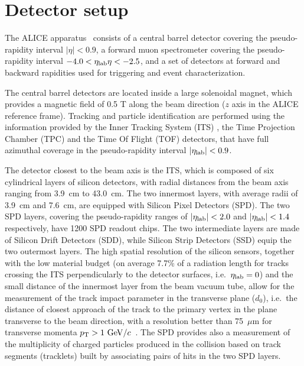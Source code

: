 
\section{Detector setup}

The ALICE apparatus~\cite{Aamodt:2008zz} consists of a central barrel detector covering the pseudo-rapidity interval $|\eta|<0.9$, a forward muon spectrometer covering the pseudo-rapidity interval $-4.0<\eta_{\rm lab}{\eta}<-2.5$, and a set of detectors at forward and backward rapidities used for triggering and event characterization. 

The central barrel detectors are located inside a large solenoidal magnet, which provides a magnetic field of 0.5 T along the beam direction ($z$ axis in the ALICE reference frame). 
Tracking and particle identification are performed using the information provided by the Inner Tracking System (ITS) \cite{Aamodt:2010aa}, the Time Projection Chamber (TPC) \cite{Alme:2010ke} and the Time Of Flight (TOF) \cite{Akindinov:2013tea} detectors, that have full azimuthal coverage in the pseudo-rapidity interval $|\eta_{\rm lab}|<0.9$. 

The detector closest to the beam axis is the ITS, which is composed of six cylindrical layers of silicon detectors, with radial distances from the beam axis ranging from 3.9~cm to 43.0~cm. 
The two innermost layers, with average radii of 3.9~cm and 7.6~cm, are equipped with Silicon Pixel Detectors (SPD). 
The two SPD layers, covering the pseudo-rapidity ranges of $|\eta_{\rm lab}|< 2.0$ and $|\eta_{\rm lab}|< 1.4$ respectively, have 1200 SPD readout chips.  
The two intermediate layers are made of Silicon Drift Detectors (SDD), while Silicon Strip Detectors (SSD) equip the two outermost layers. 
The high spatial resolution of the silicon sensors, together with the low material budget (on average 7.7\% of a radiation length for tracks crossing the ITS perpendicularly to the detector surfaces, i.e.\ $\eta_{\rm lab}=0$) and the small distance of the innermost layer from the beam vacuum tube, allow for the measurement of the track impact parameter in the transverse plane ($d_0$), i.e.\ the distance of closest approach of the track to the primary vertex in the plane transverse to the beam direction, with a resolution better than 75~$\mu$m for transverse momenta $p_{\mathrm{T}}>1~\mathrm{GeV}/c$~\cite{Aamodt:2010aa}.
The SPD provides also a measurement of the multiplicity of charged particles produced in the collision based on track segments (tracklets) built by associating pairs of hits in the two SPD layers.

